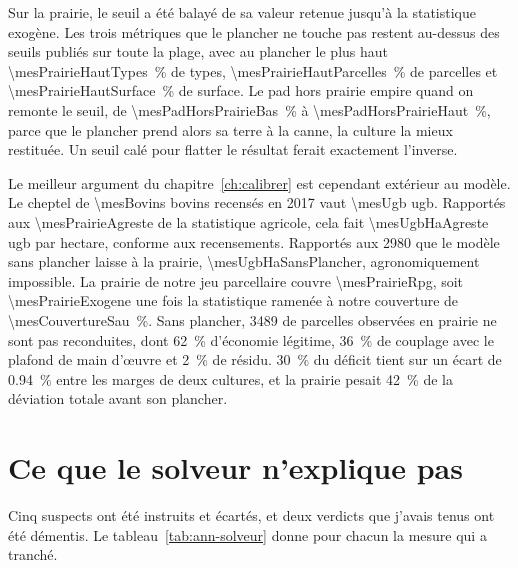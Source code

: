 Sur la prairie, le seuil a été balayé de sa valeur retenue jusqu'à la statistique exogène. Les
trois métriques que le plancher ne touche pas restent au-dessus des seuils publiés sur toute
la plage, avec au plancher le plus haut \SI{\mesPrairieHautTypes}{\percent} de types,
\SI{\mesPrairieHautParcelles}{\percent} de parcelles et \SI{\mesPrairieHautSurface}{\percent}
de surface. Le \gls{pad} hors prairie empire quand on remonte le seuil, de
\SI{\mesPadHorsPrairieBas}{\percent} à \SI{\mesPadHorsPrairieHaut}{\percent}, parce que le
plancher prend alors sa terre à la canne, la culture la mieux restituée. Un seuil calé pour
flatter le résultat ferait exactement l'inverse.

Le meilleur argument du chapitre~\ref{ch:calibrer} est cependant extérieur au modèle. Le
cheptel de \num{\mesBovins} bovins recensés en 2017 vaut \num{\mesUgb} \gls{ugb}. Rapportés
aux \SI{\mesPrairieAgreste}{\ha} de la statistique agricole, cela fait
\num{\mesUgbHaAgreste} \gls{ugb} par hectare, conforme aux recensements. Rapportés aux
\SI{2980}{\ha} que le modèle sans plancher laisse à la prairie, \num{\mesUgbHaSansPlancher},
agronomiquement impossible. La prairie de notre jeu parcellaire couvre
\SI{\mesPrairieRpg}{\ha}, soit \SI{\mesPrairieExogene}{\ha} une fois la statistique ramenée à
notre couverture de \SI{\mesCouvertureSau}{\percent}. Sans plancher, \SI{3489}{\ha} de
parcelles observées en prairie ne sont pas reconduites, dont \SI{62}{\percent} d'économie
légitime, \SI{36}{\percent} de couplage avec le plafond de main d'\oe uvre et
\SI{2}{\percent} de résidu. \SI{30}{\percent} du déficit tient sur un écart de
\SI{0.94}{\percent} entre les marges de deux cultures, et la prairie pesait
\SI{42}{\percent} de la déviation totale avant son plancher.

\section{Ce que le solveur n'explique pas}

Cinq suspects ont été instruits et écartés, et deux verdicts que j'avais tenus ont été
démentis. Le tableau~\ref{tab:ann-solveur} donne pour chacun la mesure qui a tranché.

